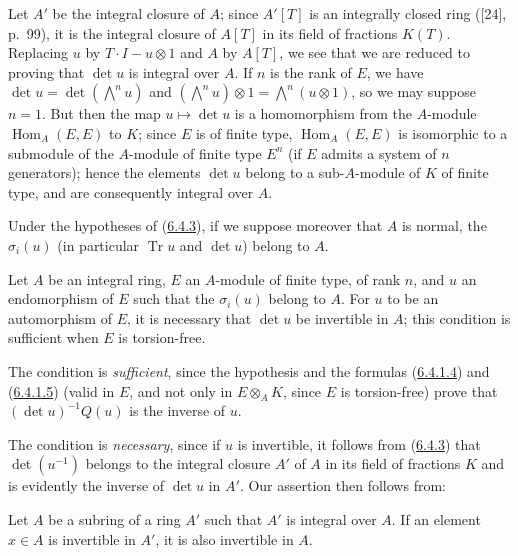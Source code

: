Let $A'$ be the integral closure of $A$; since $A'[T]$ is an integrally
closed ring ([24], p.~99), it is the integral closure of $A[T]$ in its field
of fractions $K(T)$. Replacing $u$ by $T\cdot I-u\otimes1$ and $A$ by $A[T]$,
we see that we are reduced to proving that $\det u$ is integral over $A$. If
$n$ is the rank of $E$, we have $\det u=\det(\bigwedge^n u)$ and
$(\bigwedge^n u)\otimes1=\bigwedge^n(u\otimes1)$, so we may suppose
$n=1$. But then the map $u\mapsto\det u$ is a homomorphism from the
$A$-module $\operatorname{Hom}_A(E,E)$ to $K$; since $E$ is of finite type,
$\operatorname{Hom}_A(E,E)$ is isomorphic to a submodule of the $A$-module of
finite type $E^n$ (if $E$ admits a system of $n$ generators); hence the
elements $\det u$ belong to a sub-$A$-module of $K$ of finite type, and are
consequently integral over $A$.


\begin{corollary}[6.4.4]
\label{II.6.4.4}
Under the hypotheses of (\hyperref[II.6.4.3]{6.4.3}), if we suppose
moreover that $A$ is normal, the $\sigma_i(u)$ (in particular
$\operatorname{Tr}u$ and $\det u$) belong to $A$.
\end{corollary}

\begin{proposition}[6.4.5]
\label{II.6.4.5}
Let $A$ be an integral ring, $E$ an $A$-module of finite type, of rank $n$,
and $u$ an endomorphism of $E$ such that the $\sigma_i(u)$ belong to $A$. For
$u$ to be an automorphism of $E$, it is necessary that $\det u$ be
invertible in $A$; this condition is sufficient when $E$ is torsion-free.
\end{proposition}

The condition is \emph{sufficient}, since the hypothesis and the formulas
(\hyperref[II.6.4.1.4]{6.4.1.4}) and
(\hyperref[II.6.4.1.5]{6.4.1.5}) (valid in $E$, and not only in
$E\otimes_AK$, since $E$ is torsion-free) prove that
$(\det u)^{-1}Q(u)$ is the inverse of $u$.

The condition is \emph{necessary}, since if $u$ is invertible, it follows
from (\hyperref[II.6.4.3]{6.4.3}) that $\det(u^{-1})$ belongs to the
integral closure $A'$ of $A$ in its field of fractions $K$ and is evidently
the inverse of $\det u$ in $A'$. Our assertion then follows from:

\begin{lemma}[6.4.5.1]
\label{II.6.4.5.1}
Let $A$ be a subring of a ring $A'$ such that $A'$ is integral over $A$. If
an element $x\in A$ is invertible in $A'$, it is also invertible in $A$.
\end{lemma}

